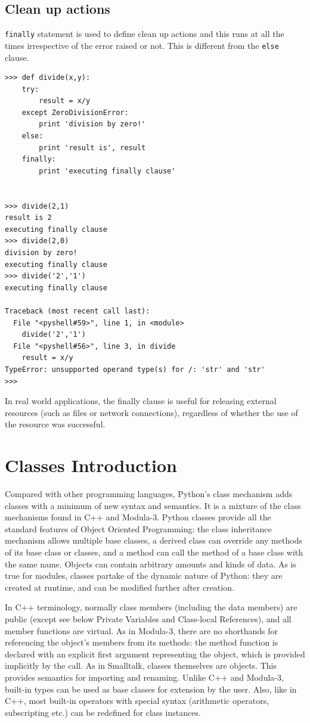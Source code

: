 \documentclass[12pt,a4paper]{article}
\begin{document}
\subsection{Clean up actions}
\texttt{finally} statement is used to define clean up actions and this runs at all the times irrespective of the error raised or not. 
This is different from the \texttt{else} clause.
\begin{verbatim}
>>> def divide(x,y):
	try:
		result = x/y
	except ZeroDivisionError:
		print 'division by zero!'
	else:
		print 'result is', result
	finally:
		print 'executing finally clause'

		
>>> divide(2,1)
result is 2
executing finally clause
>>> divide(2,0)
division by zero!
executing finally clause
>>> divide('2','1')
executing finally clause

Traceback (most recent call last):
  File "<pyshell#59>", line 1, in <module>
    divide('2','1')
  File "<pyshell#56>", line 3, in divide
    result = x/y
TypeError: unsupported operand type(s) for /: 'str' and 'str'
>>> 
\end{verbatim}
In real world applications, the finally clause is useful for releasing external resources (such as files or network connections), regardless of whether the use of the resource was successful.
\clearpage

\section{Classes Introduction}
Compared with other programming languages, Python’s class mechanism adds classes with a minimum of new syntax and semantics. It is a mixture of the class mechanisms found in C++ and Modula-3. Python classes provide all the standard features of Object Oriented Programming: the class inheritance mechanism allows multiple base classes, a derived class can override any methods of its base class or classes, and a method can call the method of a base class with the same name. Objects can contain arbitrary amounts and kinds of data. As is true for modules, classes partake of the dynamic nature of Python: they are created at runtime, and can be modified further after creation.

In C++ terminology, normally class members (including the data members) are public (except see below Private Variables and Class-local References), and all member functions are virtual. As in Modula-3, there are no shorthands for referencing the object’s members from its methods: the method function is declared with an explicit first argument representing the object, which is provided implicitly by the call. As in Smalltalk, classes themselves are objects. This provides semantics for importing and renaming. Unlike C++ and Modula-3, built-in types can be used as base classes for extension by the user. Also, like in C++, most built-in operators with special syntax (arithmetic operators, subscripting etc.) can be redefined for class instances.
\end{document}
